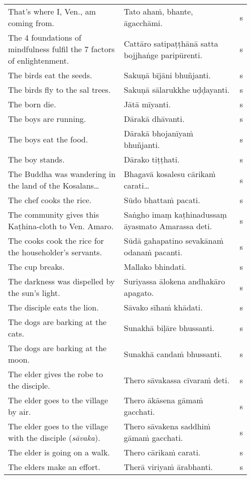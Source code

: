 \documentclass[a5paper]{memoir}
\begin{document}
\begin{longtable}{L{0.48\linewidth} L{0.48\linewidth} H}
That's where I, Ven., am coming from. & Tato ahaṁ, bhante, āgacchāmi. & s\\[0pt]
The 4 foundations of mindfulness fulfil the 7 factors of enlightenment. & Cattāro satipaṭṭhānā satta bojjhaṅge paripūrenti. & s\\[0pt]
The birds eat the seeds. & Sakuṇā bījāni bhuñjanti. & s\\[0pt]
The birds fly to the sal trees. & Sakuṇā sālarukkhe uḍḍayanti. & s\\[0pt]
The born die. & Jātā mīyanti. & s\\[0pt]
The boys are running. & Dārakā dhāvanti. & s\\[0pt]
The boys eat the food. & Dārakā bhojanīyaṁ bhuñjanti. & s\\[0pt]
The boy stands. & Dārako tiṭṭhati. & s\\[0pt]
The Buddha was wandering in the land of the Kosalans\ldots{} & Bhagavā kosalesu cārikaṁ carati\ldots{} & s\\[0pt]
The chef cooks the rice. & Sūdo bhattaṁ pacati. & s\\[0pt]
The community gives this Kaṭhina-cloth to Ven. Amaro. & Saṅgho imaṃ kaṭhinadussaṃ āyasmato Amarassa deti. & s\\[0pt]
The cooks cook the rice for the householder's servants. & Sūdā gahapatino sevakānaṁ odanaṁ pacanti. & s\\[0pt]
The cup breaks. & Mallako bhindati. & s\\[0pt]
The darkness was dispelled by the sun's light. & Suriyassa ālokena andhakāro apagato. & s\\[0pt]
The disciple eats the lion. & Sāvako sīhaṁ khādati. & s\\[0pt]
The dogs are barking at the cats. & Sunakhā biḷāre bhussanti. & s\\[0pt]
The dogs are barking at the moon. & Sunakhā candaṁ bhussanti. & s\\[0pt]
The elder gives the robe to the disciple. & Thero sāvakassa cīvaraṁ deti. & s\\[0pt]
The elder goes to the village by air. & Thero ākāsena gāmaṁ gacchati. & s\\[0pt]
The elder goes to the village with the disciple (\emph{sāvaka}). & Thero sāvakena saddhiṁ gāmaṁ gacchati. & s\\[0pt]
The elder is going on a walk. & Thero cārikaṁ carati. & s\\[0pt]
The elders make an effort. & Therā viriyaṁ ārabhanti. & s\\[0pt]

\end{longtable}
\end{document}
